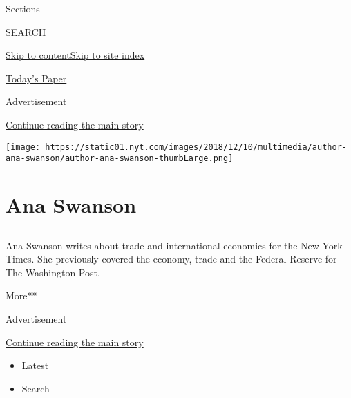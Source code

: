 Sections

SEARCH

\protect\hyperlink{site-content}{Skip to
content}\protect\hyperlink{site-index}{Skip to site index}

\href{https://myaccount.nytimes.com/auth/login?response_type=cookie\&client_id=vi}{}

\href{https://www.nytimes.com/section/todayspaper}{Today's Paper}

Advertisement

\protect\hyperlink{after-top}{Continue reading the main story}

\texttt{[image: https://static01.nyt.com/images/2018/12/10/multimedia/author-ana-swanson/author-ana-swanson-thumbLarge.png]}

\hypertarget{ana-swanson}{%
\section{Ana Swanson}\label{ana-swanson}}

\subsection{}

Ana Swanson writes about trade and international economics for the New
York Times. She previously covered the economy, trade and the Federal
Reserve for The Washington Post.

More**

Advertisement

\protect\hyperlink{after-mid1}{Continue reading the main story}

\begin{itemize}
\tightlist
\item
  \protect\hyperlink{stream-panel}{Latest}
\item
  Search
\end{itemize}

